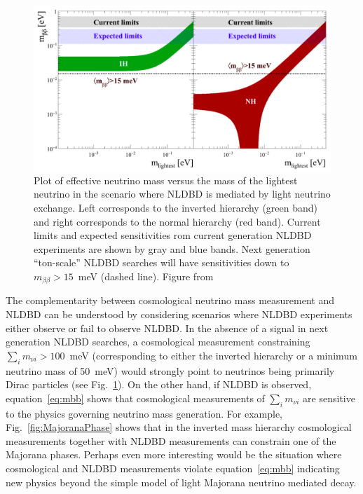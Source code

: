\begin{figure}[h!]
\centering \includegraphics[width=1.0\textwidth]{Neutrinos/NLDBD_sensitivity.png}
\caption{Plot of effective neutrino mass versus the mass of the lightest neutrino in the scenario where NLDBD is mediated by light neutrino exchange. Left corresponds to the inverted hierarchy (green band) and right corresponds to the normal hierarchy (red band). Current limits and expected sensitivities rom current generation NLDBD experiments are shown by gray and blue bands. Next generation ``ton-scale'' NLDBD searches will have sensitivities down to $m_{\beta\beta}>15$~meV (dashed line). Figure from~\cite{NSAC}}
\label{fig:NLDBD}
\end{figure}

The complementarity between cosmological neutrino mass measurement and NLDBD can be understood by considering scenarios where NLDBD experiments either observe or fail to observe NLDBD. In the absence of a signal in next generation NLDBD searches, a cosmological measurement constraining $\sum_i m_{\nu i} > 100$~meV (corresponding to either the inverted hierarchy or a minimum neutrino mass of 50~meV) would strongly point to neutrinos being primarily Dirac particles (see Fig.~\ref{fig:NLDBD}). On the other hand, if NLDBD is observed, equation~\ref{eq:mbb} shows that cosmological measurements of $\sum_i m_{\nu i}$ are sensitive to the physics governing neutrino mass generation. For example, Fig.~\ref{fig:MajoranaPhase} shows that in the inverted mass hierarchy cosmological measurements together with NLDBD measurements can constrain one of the Majorana phases. Perhaps even more interesting would be the situation where cosmological and NLDBD measurements violate equation~\ref{eq:mbb} indicating new physics beyond the simple model of light Majorana neutrino mediated decay.

